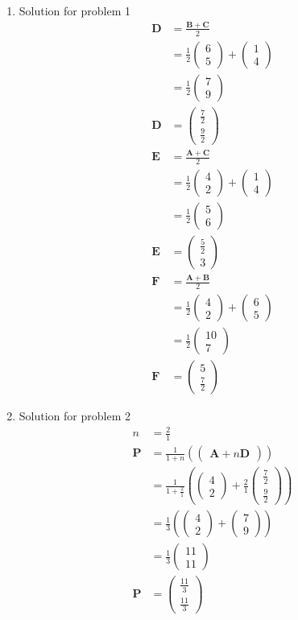\documentclass[12pt]{article}
\providecommand{\brak}[1]{\ensuremath{\left(#1\right)}}
\newcommand{\myvec}[1]{\ensuremath{\begin{pmatrix}#1\end{pmatrix}}}
\let\vec\mathbf
\begin{document}
\begin{enumerate}
\item Solution for problem 1
\begin{align}
\vec{D}&=\frac{\vec{B}+\vec{C}}{2}\\
&=\frac{1}{2}\myvec{6\\5}+\myvec{1\\4}\\
&=\frac{1}{2}\myvec{7\\9}\\
\vec{D}&=\myvec{\frac{7}{2}\\[2pt] \frac{9}{2}}\\
\vec{E}&=\frac{\vec{A}+\vec{C}}{2}\\
&=\frac{1}{2}\myvec{4\\2}+\myvec{1\\4}\\
&=\frac{1}{2}\myvec{5\\6}\\
\vec{E}&=\myvec{\frac{5}{2}\\ 3}\\
\vec{F}&=\frac{\vec{A}+\vec{B}}{2}\\
&=\frac{1}{2}\myvec{4\\2}+\myvec{6\\5}\\
&=\frac{1}{2}\myvec{10\\7}\\
\vec{F}&=\myvec{5\\ \frac{7}{2}}
\end{align}

\item Solution for problem 2
\begin{align}
n&=\frac{2}{1}\\
\vec{P}&=\frac{1}{1+n}\brak{\myvec{\vec{A}+n\vec{D}}}\\
&=\frac{1}{1+\frac{2}{1}}\brak{\myvec{4\\2}+\frac{2}{1}\myvec{\frac{7}{2}\\[2pt] \frac{9}{2}}}\\
&=\frac{1}{3}\brak{\myvec{4\\2}+\myvec{7\\9}}\\
&=\frac{1}{3}\myvec{11\\11}\\
\vec{P}&=\myvec{\frac{11}{3}\\[2pt] \frac{11}{3}}
\end{align}


\end{enumerate}
\end{document}
